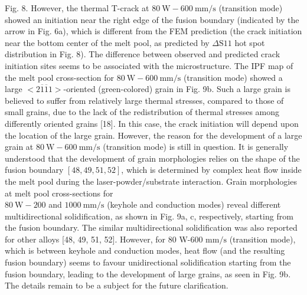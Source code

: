 \documentclass[10pt]{article}
\begin{document}
Fig. 8. However, the thermal T-crack at $80 \mathrm{~W}-600 \mathrm{~mm} / \mathrm{s}$ (transition mode) showed an initiation near the right edge of the fusion boundary (indicated by the arrow in Fig. 6a), which is different from the FEM prediction (the crack initiation near the bottom center of the melt pool, as predicted by $\Delta \mathrm{S} 11$ hot spot distribution in Fig. 8). The difference between observed and predicted crack initiation sites seems to be associated with the microstructure. The IPF map of the melt pool cross-section for $80 \mathrm{~W}-600 \mathrm{~mm} / \mathrm{s}$ (transition mode) showed a large $<2 \overline{1} \overline{1} 1>$-oriented (green-colored) grain in Fig. 9b. Such a large grain is believed to suffer from relatively large thermal stresses, compared to those of small grains, due to the lack of the redistribution of thermal stresses among differently oriented grains [18]. In this case, the crack initiation will depend upon the location of the large grain. However, the reason for the development of a large grain at $80 \mathrm{~W}-600 \mathrm{~mm} / \mathrm{s}$ (transition mode) is still in question. It is generally understood that the development of grain morphologies relies on the shape of the fusion boundary $[48,49,51,52]$, which is determined by complex heat flow inside the melt pool during the laser-powder/substrate interaction. Grain morphologies at melt pool cross-sections for\\
$80 \mathrm{~W}-200$ and $1000 \mathrm{~mm} / \mathrm{s}$ (keyhole and conduction modes) reveal different multidirectional solidification, as shown in Fig. 9a, c, respectively, starting from the fusion boundary. The similar multidirectional solidification was also reported for other alloys [48, 49, 51, 52]. However, for 80 W-600 $\mathrm{mm} / \mathrm{s}$ (transition mode), which is between keyhole and conduction modes, heat flow (and the resulting fusion boundary) seems to favour unidirectional solidification starting from the fusion boundary, leading to the development of large grains, as seen in Fig. 9b. The details remain to be a subject for the future clarification.
\end{document}
